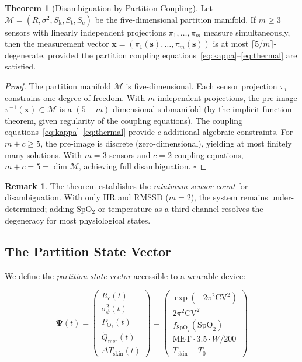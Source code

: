 \documentclass[10pt,twocolumn,a4paper]{article}
\theoremstyle{definition}
\newtheorem{theorem}{Theorem}
\newtheorem{remark}{Remark}
\newcommand{\SE}{S_{\text{e}}}
\newcommand{\SK}{S_{\text{k}}}
\newcommand{\ST}{S_{\text{t}}}
\newcommand{\Rc}{R_c}
\begin{document}
\begin{theorem}[Disambiguation by Partition Coupling]
\label{thm:disambiguation}
Let $\mathcal{M} = (R, \sigma^2, \SK, \ST, \SE)$ be the
five-dimensional partition manifold. If $m \geq 3$ sensors with
linearly independent projections $\pi_1, \ldots, \pi_m$ measure
simultaneously, then the measurement vector
$\bm{x} = (\pi_1(\bm{s}), \ldots, \pi_m(\bm{s}))$ is at most
$\lceil 5/m \rceil$-degenerate, provided the partition coupling
equations~\eqref{eq:kappa}--\eqref{eq:thermal} are satisfied.
\end{theorem}

\begin{proof}
The partition manifold $\mathcal{M}$ is five-dimensional. Each sensor
projection $\pi_i$ constrains one degree of freedom. With $m$ independent
projections, the pre-image $\pi^{-1}(\bm{x}) \subset \mathcal{M}$
is a $(5 - m)$-dimensional submanifold (by the implicit function theorem,
given regularity of the coupling equations). The coupling
equations~\eqref{eq:kappa}--\eqref{eq:thermal} provide $c$ additional
algebraic constraints. For $m + c \geq 5$, the pre-image is discrete
(zero-dimensional), yielding at most finitely many solutions. With
$m = 3$ sensors and $c = 2$ coupling equations, $m + c = 5 = \dim\mathcal{M}$,
achieving full disambiguation. $\square$
\end{proof}

\begin{remark}
The theorem establishes the \emph{minimum sensor count} for
disambiguation. With only HR and RMSSD ($m = 2$), the system remains
under-determined; adding SpO$_2$ or temperature as a third channel
resolves the degeneracy for most physiological states.
\end{remark}

\subsection{The Partition State Vector}

We define the \emph{partition state vector} accessible to a wearable
device:

\begin{equation}
\label{eq:state_vector}
\bm{\Psi}(t) = \begin{pmatrix}
\Rc(t)\\[4pt]
\sigma^2_\phi(t)\\[4pt]
P_{\text{O}_2}(t)\\[4pt]
\dot{Q}_{\text{met}}(t)\\[4pt]
\Delta T_{\text{skin}}(t)
\end{pmatrix}
= \begin{pmatrix}
\exp(-2\pi^2 \text{CV}^2)\\[4pt]
2\pi^2 \text{CV}^2\\[4pt]
f_{\text{SpO}_2}(\text{SpO}_2)\\[4pt]
\text{MET} \cdot 3.5 \cdot W / 200\\[4pt]
T_{\text{skin}} - T_0
\end{pmatrix}
\end{equation}
\end{document}
